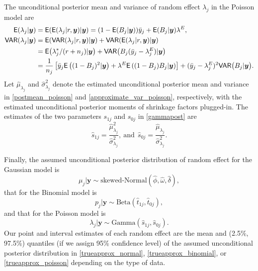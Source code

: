 \documentclass[article]{jss}
\begin{document}
The unconditional posterior mean and variance of random effect $\lambda_j$ in the Poisson model are
\begin{align}
\mathsf{E}(\lambda_j\vert \boldsymbol{y}) &=\mathsf{E}(\mathsf{E}(\lambda_{j}\vert r, \boldsymbol{y})\vert\boldsymbol{y})=(1-\mathsf{E}(B_j\vert\boldsymbol{y}))\bar{y}_j + \mathsf{E}(B_j\vert  \boldsymbol{y})\lambda^E,\label{postmean_poisson} \\
\mathsf{VAR}(\lambda_{j}\vert \boldsymbol{y}) &=  \mathsf{E}(\mathsf{VAR}(\lambda_{j}\vert r,  \boldsymbol{y})\vert \boldsymbol{y})+\mathsf{VAR}(\mathsf{E}(\lambda_{j}\vert r, \boldsymbol{y})\vert \boldsymbol{y})\label{postvar_poisson}\\
&= \mathsf{E}\big(\lambda^{\ast}_{j}/ (r+n_{j})\vert  \boldsymbol{y}\big)+\mathsf{VAR}\big(B_{j}(\bar{y}_{j}-\lambda^E_{j})\vert \boldsymbol{y}\big) \\
&=\frac{1}{n_j}\left[\bar{y}_j\mathsf{E}\left((1-B_j)^2\vert \boldsymbol{y}\right)+\lambda^E\mathsf{E}\left((1-B_j)B_j\vert \boldsymbol{y}\right)\right]+(\bar{y}_{j}-\lambda^E_{j})^2\mathsf{VAR}\big(B_{j}\vert \boldsymbol{y}\big).\label{approximate_var_poisson}
\end{align}
Let  $\hat{\mu}_{\lambda_j}$ and $\hat{\sigma}^2_{\lambda_j}$ denote the estimated unconditional posterior mean and variance in  \eqref{postmean_poisson} and \eqref{approximate_var_poisson}, respectively, with the estimated unconditional posterior moments of shrinkage factors plugged-in. The estimates of the two parameters $s_{1j}$ and $s_{0j}$ in  \eqref{gammapost} are
\begin{equation}\label{posttrueprob}
\hat{s}_{1j}=\frac{\hat{\mu}_{\lambda_j}^2}{\hat{\sigma}^2_{\lambda_j}},~\textrm{and}~~\hat{s}_{0j}=\frac{\hat{\mu}_{\lambda_j}}{\hat{\sigma}^2_{\lambda_j}}.
\end{equation}


Finally, the assumed unconditional posterior distribution of random effect for the Gaussian model is
\begin{equation}\label{trueapprox_normal}
\mu_j\vert \boldsymbol{y} \sim \textrm{skewed-Normal}(\hat{\phi}, \hat{\omega}, \hat{\delta}),
\end{equation}
that for the Binomial model is
\begin{equation}\label{trueapprox_binomial}
p_j\vert \boldsymbol{y} \sim \textrm{Beta}(\hat{t}_{1j}, \hat{t}_{0j}),
\end{equation}
and that for the Poisson model is
\begin{equation}\label{trueapprox_poisson}
\lambda_j\vert \boldsymbol{y} \sim \textrm{Gamma}(\hat{s}_{1j}, \hat{s}_{0j}).
\end{equation}
Our point and interval estimates of each random effect are the  mean and (2.5\%, 97.5\%) quantiles (if we assign 95\% confidence level) of the assumed unconditional posterior distribution in  \eqref{trueapprox_normal}, \eqref{trueapprox_binomial}, or \eqref{trueapprox_poisson} depending on the type of data.
\end{document}
